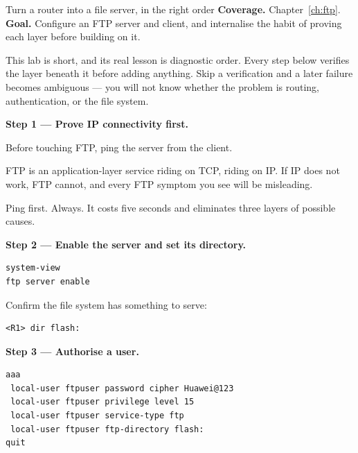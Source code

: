 
\begin{labproject}{Turn a router into a file server, in the right order}
\textbf{Coverage.} Chapter~\ref{ch:ftp}.\\
\textbf{Goal.} Configure an FTP server and client, and internalise the habit of proving each layer before building on it.

\begin{labmode}
This lab is short, and its real lesson is diagnostic order. Every step below verifies the layer beneath it before adding anything. Skip a verification and a later failure becomes ambiguous --- you will not know whether the problem is routing, authentication, or the file system.
\end{labmode}

\medskip\noindent\textbf{Step 1 --- Prove IP connectivity first.}\par
Before touching FTP, ping the server from the client.

\begin{keyidea}
FTP is an application-layer service riding on TCP, riding on IP. If IP does not work, FTP cannot, and every FTP symptom you see will be misleading.

Ping first. Always. It costs five seconds and eliminates three layers of possible causes.
\end{keyidea}

\medskip\noindent\textbf{Step 2 --- Enable the server and set its directory.}\par

\begin{lstlisting}[style=dcnterminal]
system-view
ftp server enable
\end{lstlisting}

Confirm the file system has something to serve:

\begin{lstlisting}[style=dcnterminal]
<R1> dir flash:
\end{lstlisting}

\medskip\noindent\textbf{Step 3 --- Authorise a user.}\par

\begin{lstlisting}[style=dcnterminal]
aaa
 local-user ftpuser password cipher Huawei@123
 local-user ftpuser privilege level 15
 local-user ftpuser service-type ftp
 local-user ftpuser ftp-directory flash:
quit
\end{lstlisting}


\end{labproject}
